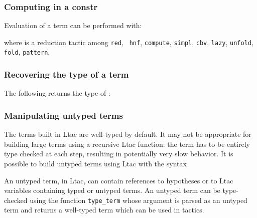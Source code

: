 \subsubsection[Computing in a constr]{Computing in a constr
}

Evaluation of a term can be performed with:
\begin{quote}
{}
\end{quote}
where  is a reduction tactic among {\tt red}, {\tt
hnf}, {\tt compute}, {\tt simpl}, {\tt cbv}, {\tt lazy}, {\tt unfold},
{\tt fold}, {\tt pattern}.

\subsubsection{Recovering the type of a term}

The following returns the type of {\term}:

\begin{quote}
{}
\end{quote}

\subsubsection[Manipulating untyped terms]{Manipulating untyped terms
}

The terms built in Ltac are well-typed by default. It may not be
appropriate for building large terms using a recursive Ltac function:
the term has to be entirely type checked at each step, resulting in
potentially very slow behavior. It is possible to build untyped terms
using Ltac with the syntax

\begin{quote}
{}
\end{quote}

An untyped term, in Ltac, can contain references to hypotheses or to
Ltac variables containing typed or untyped terms. An untyped term can
be type-checked using the function {\tt type\_term} whose argument is
parsed as an untyped term and returns a well-typed term which can be
used in tactics.


